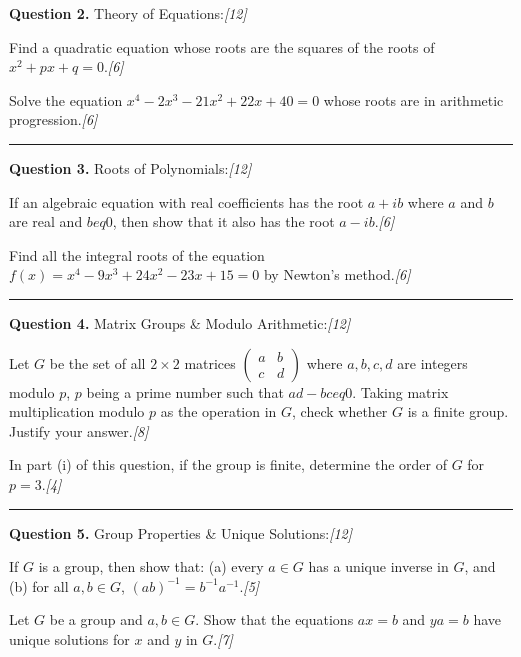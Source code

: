\documentclass[11pt,a4paper]{article}
\newcommand{\pts}[1]{\hfill   \textit{[#1]}}
\begin{document}
{\noindent   \textbf{Question 2.} Theory of Equations:\pts{12}

\begin{parts}
  \item Find a quadratic equation whose roots are the squares of the roots of $x^2 + px + q = 0$.\pts{6}
  \item Solve the equation $x^4 - 2x^3 - 21x^2 + 22x + 40 = 0$ whose roots are in arithmetic progression.\pts{6}
\end{parts}

\medskip\rule{\linewidth}{0.2pt}




\noindent   \textbf{Question 3.} Roots of Polynomials:\pts{12}

\begin{parts}
  \item If an algebraic equation with real coefficients has the root $a + ib$ where $a$ and $b$ are real and $b 
eq 0$, then show that it also has the root $a - ib$.\pts{6}
  \item Find all the integral roots of the equation $f(x) = x^4 - 9x^3 + 24x^2 - 23x + 15 = 0$ by Newton's method.\pts{6}
\end{parts}

\medskip\rule{\linewidth}{0.2pt}




\noindent   \textbf{Question 4.} Matrix Groups \& Modulo Arithmetic:\pts{12}

\begin{parts}
  \item Let $G$ be the set of all $2  \times 2$ matrices $
\begin{pmatrix} a & b \\ c & d \end{pmatrix}$ where $a, b, c, d$ are integers modulo $p$, $p$ being a prime number such that $ad - bc 
eq 0$. Taking matrix multiplication modulo $p$ as the operation in $G$, check whether $G$ is a finite group. Justify your answer.\pts{8}
  \item In part (i) of this question, if the group is finite, determine the order of $G$ for $p = 3$.\pts{4}
\end{parts}

\medskip\rule{\linewidth}{0.2pt}




\noindent   \textbf{Question 5.} Group Properties \& Unique Solutions:\pts{12}

\begin{parts}
  \item If $G$ is a group, then show that: (a) every $a \in G$ has a unique inverse in $G$, and (b) for all $a, b \in G$, $(ab)^{-1} = b^{-1} a^{-1}$.\pts{5}
  \item Let $G$ be a group and $a, b \in G$. Show that the equations $ax = b$ and $ya = b$ have unique solutions for $x$ and $y$ in $G$.\pts{7}
\end{parts}

}
\end{document}
